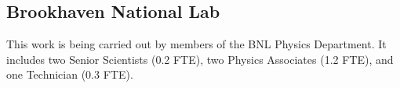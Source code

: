 \subsection{Brookhaven National Lab} 
This work is being carried out by members of the BNL Physics Department. It includes two Senior Scientists (0.2 FTE), two Physics Associates (1.2 FTE), and one Technician (0.3 FTE). 